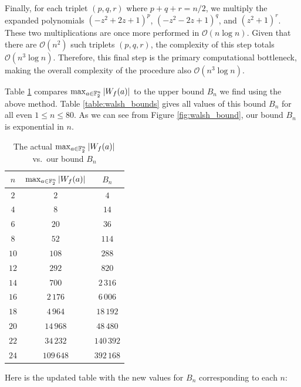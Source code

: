 \documentclass[11pt]{llncs}
\begin{document}
Finally, for each triplet $(p,q,r)$ where $p+q+r=n/2$, we multiply the expanded polynomials $(-z^2 + 2z + 1)^p$, $(-z^2 - 2z + 1)^q$, and $(z^2 + 1)^r$. These two multiplications are once more performed in $\mathcal{O}(n \log n)$. Given that there are $\mathcal{O}(n^2)$ such triplets $(p,q,r)$, the complexity of this step totals $\mathcal{O}(n^3 \log n)$. Therefore, this final step is the primary computational bottleneck, making the overall complexity of the procedure also $\mathcal{O}(n^3 \log n)$.

Table \ref{table:max_walsh_vs_bound} compares $\max_{a\in\mathbb F_2^n}|W_{f}(a)|$ to the upper bound $B_n$ we find using the above method. Table \ref{table:walsh_bounds} gives all values of this bound $B_n$ for all even $1\leq n\leq 80$. As we can see from Figure \ref{fig:walsh_bound}, our bound $B_n$ is exponential in $n$.

\begin{table}
    \centering
    \begin{tabular}{|c|c|c|}
    \hline
    $n$ & $\max_{a\in\mathbb{F}_2^n}|W_f(a)|$ & $B_n$ \\ \hline
    $2$  & $2$     & $4$     \\
    $4$  & $8$     & $14$     \\
    $6$  & $20$    & $36$    \\
    $8$  & $52$    & $114$    \\
    $10$ & $108$   & $288$   \\
    $12$ & $292$   & $820$   \\
    $14$ & $700$   & $2\,316$  \\
    $16$ & $2\,176$  & $6\,006$  \\
    $18$ & $4\,964$  & $18\,192$  \\
    $20$ & $14\,968$ & $48\,480$ \\
    $22$ & $34\,232$ & $140\,392$ \\
    $24$ & $109\,648$ & $392\,168$ \\ \hline
    \end{tabular}
    \caption{The actual $\max_{a\in\mathbb{F}_2^n}|W_f(a)|$ vs.\ our bound $B_n$}
    \label{table:max_walsh_vs_bound}
\end{table}

Here is the updated table with the new values for \( B_n \) corresponding to each \( n \):
\end{document}
